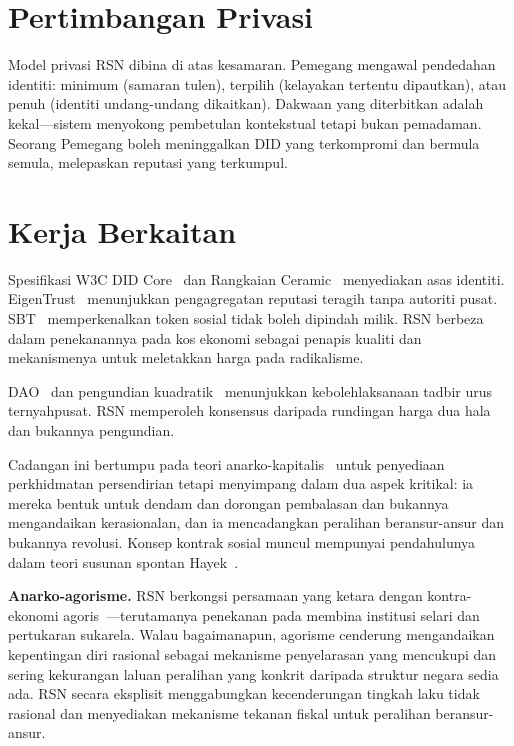\documentclass[11pt,a4paper,twocolumn]{article}
\begin{document}
\section{Pertimbangan Privasi}

Model privasi RSN dibina di atas kesamaran. Pemegang mengawal pendedahan identiti: minimum (samaran tulen), terpilih (kelayakan tertentu dipautkan), atau penuh (identiti undang-undang dikaitkan). Dakwaan yang diterbitkan adalah kekal---sistem menyokong pembetulan kontekstual tetapi bukan pemadaman. Seorang Pemegang boleh meninggalkan DID yang terkompromi dan bermula semula, melepaskan reputasi yang terkumpul.

\section{Kerja Berkaitan}

Spesifikasi W3C DID Core~\cite{did2022} dan Rangkaian Ceramic~\cite{ceramic2023} menyediakan asas identiti. EigenTrust~\cite{kamvar2003} menunjukkan pengagregatan reputasi teragih tanpa autoriti pusat. SBT~\cite{weyl2022} memperkenalkan token sosial tidak boleh dipindah milik. RSN berbeza dalam penekanannya pada kos ekonomi sebagai penapis kualiti dan mekanismenya untuk meletakkan harga pada radikalisme.

DAO~\cite{buterin2014} dan pengundian kuadratik~\cite{buterin2019} menunjukkan kebolehlaksanaan tadbir urus ternyahpusat. RSN memperoleh konsensus daripada rundingan harga dua hala dan bukannya pengundian.

Cadangan ini bertumpu pada teori anarko-kapitalis~\cite{rothbard1973,hoppe2001} untuk penyediaan perkhidmatan persendirian tetapi menyimpang dalam dua aspek kritikal: ia mereka bentuk untuk dendam dan dorongan pembalasan dan bukannya mengandaikan kerasionalan, dan ia mencadangkan peralihan beransur-ansur dan bukannya revolusi. Konsep kontrak sosial muncul mempunyai pendahulunya dalam teori susunan spontan Hayek~\cite{hayek1973}.

\textbf{Anarko-agorisme.} RSN berkongsi persamaan yang ketara dengan kontra-ekonomi agoris~\cite{konkin2006}---terutamanya penekanan pada membina institusi selari dan pertukaran sukarela. Walau bagaimanapun, agorisme cenderung mengandaikan kepentingan diri rasional sebagai mekanisme penyelarasan yang mencukupi dan sering kekurangan laluan peralihan yang konkrit daripada struktur negara sedia ada. RSN secara eksplisit menggabungkan kecenderungan tingkah laku tidak rasional dan menyediakan mekanisme tekanan fiskal untuk peralihan beransur-ansur.
\end{document}
